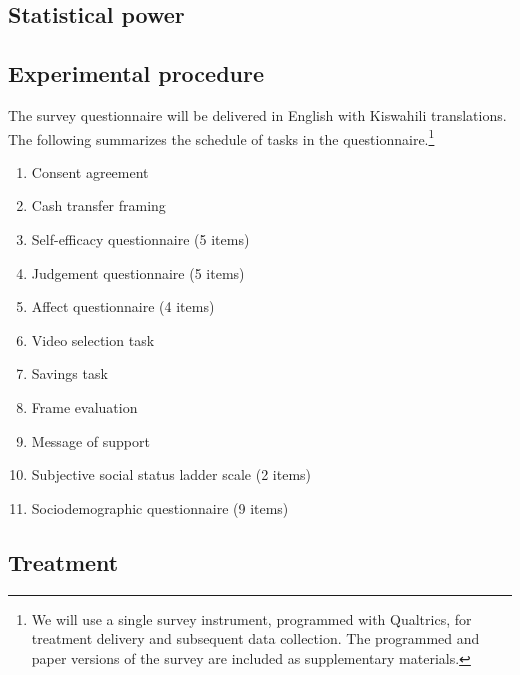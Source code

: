\documentclass[11pt, a4paper]{article}\usepackage[]{graphicx}\usepackage[]{color}
\begin{document}
    \subsection{Statistical power}


    \subsection{Experimental procedure}

        The survey questionnaire will be delivered in English with Kiswahili translations. The following summarizes the schedule of tasks in the questionnaire.\footnote{We will use a single survey instrument, programmed with Qualtrics, for treatment delivery and subsequent data collection. The programmed and paper versions of the survey are included as supplementary materials.}

        \begin{enumerate}
            \item Consent agreement
            \item Cash transfer framing
            \item Self-efficacy questionnaire (5 items)
            \item Judgement questionnaire (5 items)
            \item Affect questionnaire (4 items)
            \item Video selection task
            \item Savings task
            \item Frame evaluation
            \item Message of support
            \item Subjective social status ladder scale (2 items)
            \item Sociodemographic questionnaire (9 items)
        \end{enumerate}

    \subsection{Treatment}
\end{document}
